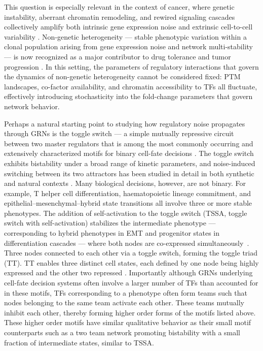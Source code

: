 \documentclass[11pt]{article}
\begin{document}
This question is especially relevant in the context of cancer, where genetic instability, aberrant chromatin remodeling, and rewired signaling cascades collectively amplify both intrinsic gene expression noise and extrinsic cell-to-cell variability \cite{Brock2009Non-geneticTumours, Landau2014LocallyLeukemia, Hanahan2026HallmarksBeyond}. Non-genetic heterogeneity — stable phenotypic variation within a clonal population arising from gene expression noise and network multi-stability — is now recognized as a major contributor to drug tolerance and tumor progression \cite{Hanahan2026HallmarksBeyond, Franca2024CellularContinuum, Shaffer2017RareResistance}. In this setting, the parameters of regulatory interactions that govern the dynamics of non-genetic heterogeneity cannot be considered fixed: PTM landscapes, co-factor availability, and chromatin accessibility to TFs all fluctuate, effectively introducing stochasticity into the fold-change parameters that govern network behavior. 


Perhaps a natural starting point to studying how regulatory noise propagates through GRNs is the toggle switch — a simple mutually repressive circuit between two master regulators that is among the most commonly occurring and extensively characterized motifs for binary cell-fate decisions \cite{gardner2000construction}. The toggle switch exhibits bistability under a broad range of kinetic parameters, and noise-induced switching between its two attractors has been studied in detail in both synthetic and natural contexts \cite{tian2006stochastic}. Many biological decisions, however, are not binary. For example, T helper cell differentiation, haematopoietic lineage commitment, and epithelial–mesenchymal–hybrid state transitions all involve three or more stable phenotypes. The addition of self-activation to the toggle switch (TSSA, toggle switch with self-activation) stabilizes the intermediate phenotype --- corresponding to hybrid phenotypes in EMT and progenitor states in differentiation cascades --- where both nodes are co-expressed simultaneously~\cite{Lu2013}. Three nodes connected to each other via a toggle switch, forming the toggle triad (TT). TT enables three distinct cell states, each defined by one node being highly expressed and the other two repressed \cite{doi:10.1098/rsif.2020.0631}. Importantly although GRNs underlying cell-fate decision systems often involve a larger number of TFs than accounted for in these motifs, TFs corresponding to a phenotype often form teams such that nodes belonging to the same team activate each other. These teams mutually inhibit each other, thereby forming higher order forms of the motifs listed above. These higher order motifs have similar qualitative behavior as their small motif counterparts such as a two team network promoting bistability with a small fraction of intermediate states, similar to TSSA. 
\end{document}
